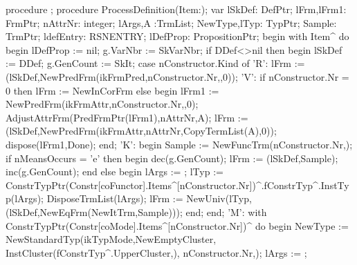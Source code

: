procedure ;
   procedure ProcessDefinition(Item:);
   var
      lSkDef: DefPtr;
      lFrm,lFrm1: FrmPtr;
      nAttrNr: integer;
      lArgs,A :TrmList;
      NewType,lTyp: TypPtr;
      Sample: TrmPtr;
      ldefEntry: RSNENTRY;
      lDefProp: PropositionPtr;
   begin
      with Item^ do
      begin
         lDefProp := nil;
         g.VarNbr := SkVarNbr;
         if DDef<>nil then
         begin
            lSkDef := DDef;
            g.GenCount := SkIt;
            case nConstructor.Kind of
               'R': lFrm := (lSkDef,NewPredFrm(ikFrmPred,nConstructor.Nr,,0));
               'V':
                  if  nConstructor.Nr = 0 then
                     lFrm := NewInCorFrm
                  else
                  begin
                     lFrm1 := NewPredFrm(ikFrmAttr,nConstructor.Nr,,0);
                     AdjustAttrFrm(PredFrmPtr(lFrm1),nAttrNr,A);
                     lFrm := (lSkDef,NewPredFrm(ikFrmAttr,nAttrNr,CopyTermList(A),0));
                     dispose(lFrm1,Done);
                  end;
               'K':
                  begin Sample := NewFuncTrm(nConstructor.Nr,);
                  if nMeansOccurs = 'e' then
                  begin dec(g.GenCount);
                  lFrm := (lSkDef,Sample);
                  inc(g.GenCount);
                  end
                  else
                  begin
                     lArgs := ;
                     lTyp := ConstrTypPtr(Constr[coFunctor].Items^[nConstructor.Nr])^.fConstrTyp^.InstTyp(lArgs);
                     DisposeTrmList(lArgs);
                     lFrm := NewUniv(lTyp,(lSkDef,NewEqFrm(NewItTrm,Sample)));
                  end;
                  end;
               'M':
                  with ConstrTypPtr(Constr[coMode].Items^[nConstructor.Nr])^ do
               begin
                  NewType := 
                     NewStandardTyp(ikTypMode,NewEmptyCluster,
                                    InstCluster(fConstrTyp^.UpperCluster,),
                                    nConstructor.Nr,);
                  lArgs := ;
